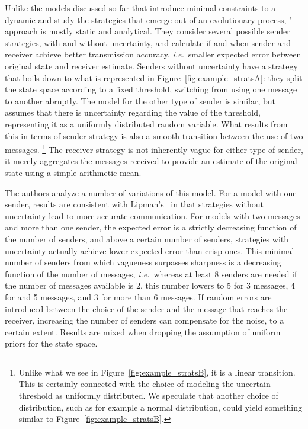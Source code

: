 \documentclass[a4paper]{article}
\begin{document}
Unlike the models discussed so far that introduce minimal constraints to a dynamic and study the strategies that emerge out of an evolutionary process, \citeauthor{lawry_vagueness_2017}' approach is mostly static and analytical.
They consider several possible sender strategies, with and without uncertainty, and calculate if and when sender and receiver achieve better transmission accuracy, \emph{i.e.}~smaller expected error between original state and receiver estimate.
Senders without uncertainty have a strategy that boils down to what is represented in Figure~\ref{fig:example_stratsA}: they split the state space according to a fixed threshold, switching from using one message to another abruptly.
The model for the other type of sender is similar, but assumes that there is uncertainty regarding the value of the threshold, representing it as a uniformly distributed random variable.
What results from this in terms of sender strategy is also a smooth transition between the use of two messages.%
\footnote{Unlike what we see in Figure~\ref{fig:example_stratsB}, it is a linear transition. This is certainly connected with the choice of modeling the uncertain threshold as uniformly distributed. We speculate that another choice of distribution, such as for example a normal distribution, could yield something similar to Figure~\ref{fig:example_stratsB}.}%
The receiver strategy is not inherently vague for either type of sender, it merely aggregates the messages received to provide an estimate of the original state using a simple arithmetic mean.

The authors analyze a number of variations of this model.
For a model with one sender, results are consistent with Lipman's~\parencite*{lipman_why_2009} in that strategies without uncertainty lead to more accurate communication.
For models with two messages and more than one sender, the expected error is a strictly decreasing function of the number of senders, and above a certain number of senders, strategies with uncertainty actually achieve lower expected error than crisp ones.
This minimal number of senders from which vagueness surpasses sharpness is a decreasing function of the number of messages, \emph{i.e.}~whereas at least 8 senders are needed if the number of messages available is 2, this number lowers to 5 for 3 messages, 4 for and 5 messages, and 3 for more than 6 messages.
If random errors are introduced between the choice of the sender and the message that reaches the receiver, increasing the number of senders can compensate for the noise, to a certain extent.
Results are mixed when dropping the assumption of uniform priors for the state space.
\end{document}
